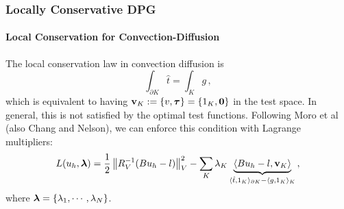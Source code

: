 \documentclass[18pt,xcolor=table]{beamer}
\begin{document}
%                                                                                                                      
%                                                                                                                      
%     
\begin{frame}
\frametitle{Locally Conservative DPG}
\framesubtitle{Local Conservation for Convection-Diffusion}
The local conservation law in convection diffusion is
\[
\int_{\partial K}\hat t=\int_K g\,,
\]
which is equivalent to having $\mathbf{v}_K:=\{v,\boldsymbol\tau\}=\{1_K,\boldsymbol0\}$ in the test space.
In general, this is not satisfied by the optimal test functions.
Following Moro et al (also
Chang and Nelson), we
can enforce this condition with Lagrange multipliers:
\begin{align*}
L(u_h,\boldsymbol\lambda) = \frac{1}{2}\left\| R_V^{-1}(Bu_h-l) \right\|_V^2
-\sum_K\lambda_K\underbrace{\langle Bu_h-l,\mathbf{v}_K\rangle}_
{\langle\hat t, 1_K\rangle_{\partial K}-\langle g,1_K\rangle_K}\,,
\end{align*}
where $\boldsymbol\lambda=\{\lambda_1,\cdots,\lambda_N\}$.
\end{frame}

\end{document}
